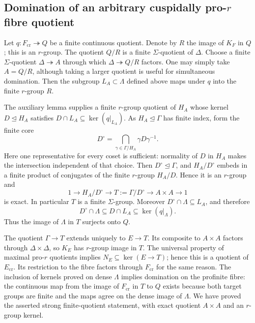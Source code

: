 \subsection{Domination of an arbitrary cuspidally pro-$r$ fibre quotient}

Let $q:F_{\mathrm{cr}}\twoheadrightarrow Q$ be a finite continuous
quotient. Denote by $R$ the image of $K_F$ in $Q$; this is an $r$-group.
The quotient $Q/R$ is a finite $\Sigma$-quotient of $\Delta$.
Choose a finite $\Sigma$-quotient $\Delta\twoheadrightarrow A$ through
which $\Delta\twoheadrightarrow Q/R$ factors. One may simply take
$A=Q/R$, although taking a larger quotient is useful for simultaneous
domination. Then the subgroup $L_A\subset\Lambda$ defined above maps
under $q$ into the finite $r$-group $R$.

The auxiliary lemma supplies a finite $r$-group quotient of $H_A$ whose
kernel $D\trianglelefteq H_A$ satisfies
$D\cap L_A\subseteq\ker(q|_{L_A})$.
As $H_A\trianglelefteq\Gamma$ has finite index, form the finite core
\[
 D^\circ=\bigcap_{\gamma\in\Gamma/H_A}\gamma D\gamma^{-1}.
\]
Here one representative for every coset is sufficient: normality of
$D$ in $H_A$ makes the intersection independent of that choice.
Then $D^\circ\trianglelefteq\Gamma$, and
$H_A/D^\circ$ embeds in a finite product of conjugates of the finite
$r$-group $H_A/D$. Hence it is an $r$-group and
\[
 1\longrightarrow H_A/D^\circ\longrightarrow
 T:=\Gamma/D^\circ\longrightarrow A\times A\longrightarrow1
\]
is exact. In particular $T$ is a finite $\Sigma$-group.
Moreover $D^\circ\cap\Lambda\subseteq L_A$, and therefore
\[
 D^\circ\cap\Lambda
 \subseteq D\cap L_A\subseteq\ker(q|_\Lambda).
\]
Thus the image of $\Lambda$ in $T$ surjects onto $Q$.

The quotient $\Gamma\to T$ extends uniquely to $E\to T$.
Its composite to $A\times A$ factors through $\Delta\times\Delta$,
so $K_E$ has $r$-group image in $T$. The universal property of maximal
pro-$r$ quotients implies $N_E\subseteq\ker(E\to T)$; hence this is
a quotient of $E_{\mathrm{cr}}$. Its restriction to the fibre factors
through $F_{\mathrm{cr}}$ for the same reason. The inclusion of kernels
proved on dense $\Lambda$ implies domination on the profinite fibre:
the continuous map from the image of $F_{\mathrm{cr}}$ in $T$ to $Q$
exists because both target groups are finite and the maps agree on
the dense image of $\Lambda$.
We have proved the asserted strong finite-quotient statement, with
exact quotient $A\times A$ and an $r$-group kernel.

